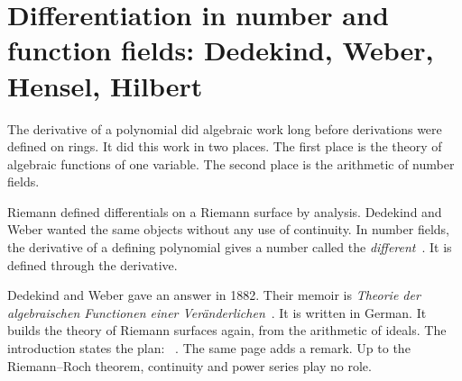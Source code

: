 \section[Differentiation in number and function fields: Dedekind, Weber, Hensel, Hilbert][Number and function fields]{Differentiation in number and function fields: Dedekind, Weber, Hensel, Hilbert}\label{sec:origins:function-fields}

The derivative of a polynomial did algebraic work long before derivations
were defined on rings. It did this work in two places. The first place is
the theory of algebraic functions of one variable. The second place is the
arithmetic of number fields.

Riemann defined differentials on a Riemann surface by analysis. Dedekind and
Weber wanted the same objects without any use of continuity. In number
fields, the derivative of a defining polynomial gives a number called the
\emph{different}~\cite[\S 3, p.~179]{Hilbert1897}. It is defined through the derivative.

Dedekind and Weber gave an answer in 1882. Their memoir is \emph{Theorie der algebraischen Functionen einer
Ver\"anderlichen}~\cite{DedekindWeber1882}. It is written in German. It
builds the theory of Riemann surfaces again, from the arithmetic of ideals. The
introduction states the plan: %
~\cite[p.~183]{DedekindWeber1882}. The same page adds a remark. Up to the
Riemann--Roch theorem, continuity and power series play no role.

